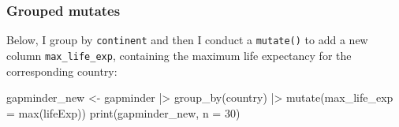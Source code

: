 \documentclass[
  letterpaper,
  DIV=11,
  numbers=noendperiod]{scrreprt}
\newenvironment{Shaded}{\begin{snugshade}}{\end{snugshade}}
\newcommand{\AttributeTok}[1]{\textcolor[rgb]{0.40,0.45,0.13}{#1}}
\newcommand{\DecValTok}[1]{\textcolor[rgb]{0.68,0.00,0.00}{#1}}
\newcommand{\FunctionTok}[1]{\textcolor[rgb]{0.28,0.35,0.67}{#1}}
\newcommand{\NormalTok}[1]{\textcolor[rgb]{0.00,0.23,0.31}{#1}}
\newcommand{\OtherTok}[1]{\textcolor[rgb]{0.00,0.23,0.31}{#1}}
\newcommand{\SpecialCharTok}[1]{\textcolor[rgb]{0.37,0.37,0.37}{#1}}
\begin{document}
\subsubsection{Grouped mutates}\label{grouped-mutates}

Below, I group by \texttt{continent} and then I conduct a
\texttt{mutate()} to add a new column \texttt{max\_life\_exp},
containing the maximum life expectancy for the corresponding country:

\begin{Shaded}
\begin{Highlighting}[]
\NormalTok{gapminder\_new }\OtherTok{\textless{}{-}}\NormalTok{ gapminder }\SpecialCharTok{|\textgreater{}} 
  \FunctionTok{group\_by}\NormalTok{(country) }\SpecialCharTok{|\textgreater{}}
  \FunctionTok{mutate}\NormalTok{(}\AttributeTok{max\_life\_exp =} \FunctionTok{max}\NormalTok{(lifeExp)) }
\FunctionTok{print}\NormalTok{(gapminder\_new, }\AttributeTok{n =} \DecValTok{30}\NormalTok{)}
\end{Highlighting}
\end{Shaded}
\end{document}
